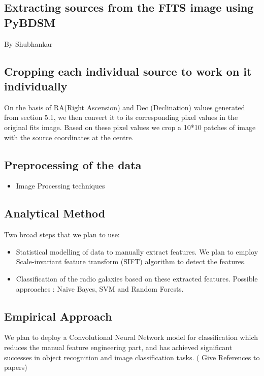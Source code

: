 \documentclass{article}
\begin{document}
\begin{multicols*}{2}
\subsection{Extracting sources from the FITS image using PyBDSM}
  By Shubhankar
\subsection{Cropping each individual source to work on it individually}
 On the basis of RA(Right Ascension) and Dec (Declination) values generated from section 5.1, we then convert it to its corresponding pixel values in the original fits image. Based on these pixel values we crop a 10*10 patches of image with the source coordinates at the centre.

\subsection{Preprocessing of the data}

\begin{itemize}
\item Image Processing techniques
\end{itemize}

\subsection{Analytical Method}

Two broad steps that we plan to use: 
\begin{itemize}
	\item Statistical modelling of data to manually extract features. We plan to employ Scale-invariant feature transform (SIFT) algorithm to detect the features.  
	\item Classification of the radio galaxies based on these extracted features. Possible approaches : Naive Bayes, SVM and Random Forests.
\end{itemize}


\subsection{Empirical Approach}

We plan to deploy a Convolutional Neural Network model for classification which reduces the manual feature engineering part, and has achieved significant successes in object recognition and image classification tasks. ( Give References to papers) 
    



\end{multicols*}
\end{document}
